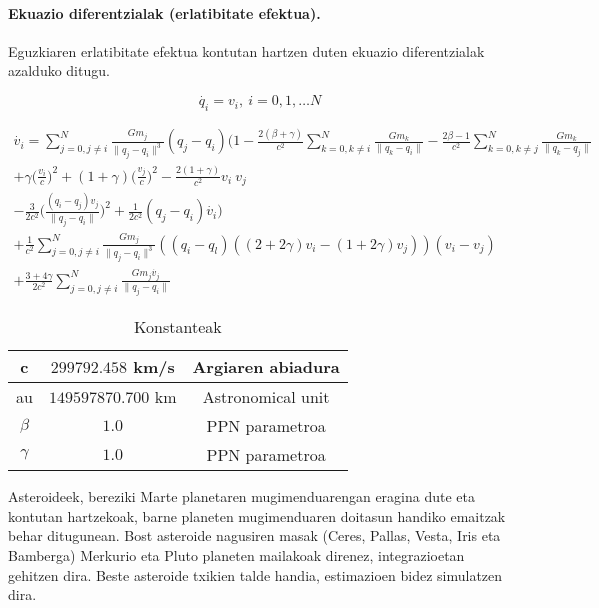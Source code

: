 \paragraph*{Ekuazio diferentzialak (erlatibitate efektua).}
Eguzkiaren erlatibitate efektua kontutan hartzen duten ekuazio diferentzialak azalduko ditugu.

\begin{equation}
\dot{q_i}=v_i, \  i=0,1,\dots N
\end{equation}

\begin{multline} 
\dot{v_i}= \sum_{j=0,j \neq i}^{N} \frac{Gm_j}{\|q_j-q_i\|^3} (q_j-q_i)
           \bigg(1- \frac{2(\beta+\gamma)}{c^2} \sum\limits_{k=0, k \neq i}^{N} \frac{Gm_k}{\|q_k-q_i\|} 
                  - \frac{2\beta-1}{c^2}        \sum\limits_{k=0, k \neq j}^{N} \frac{Gm_k}{\|q_k-q_j\|} \\
                  + \gamma \big(\frac{v_i}{c}\big)^2 + (1+\gamma) \big(\frac{v_j}{c} \big)^2 
                  - \frac{2(1+\gamma)}{c^2} v_i \ v_j \\
                  - \frac{3}{2c^2} \big(\frac{(q_i-q_j) v_j}{\|q_j-q_i\|} \big)^2+                  
                  \frac{1}{2c^2}(q_j-q_i) \dot{v_i} \bigg) \\
           + \frac{1}{c^2} \sum_{j=0,j \neq i}^{N} \frac{Gm_j}{\|q_j-q_i\|^3} 
             ((q_i-q_l) ((2+2\gamma)v_i-(1+2\gamma)v_j)) (v_i-v_j) \\
           + \frac{3+4\gamma}{2c^2} \sum_{j=0,j \neq i}^{N} \frac{Gm_j \dot{v_j}}{\|q_j-q_i\|}                                      
\end{multline}

\begin{table}[h]
\caption{Konstanteak}
\label{tab:1}       %
\centering
\begin{tabular}{ c c c }
\hline
  c             &  $299792.458$ km/s           & Argiaren abiadura  \\
\hline
  au            &  $149597870.700$ km           & Astronomical unit  \\
\hline 	       
$\beta$          & $1.0$                       & PPN parametroa     \\
\hline 
$\gamma$         & $1.0$                       & PPN parametroa     \\
\hline
\end{tabular}
\end{table}

Asteroideek, bereziki Marte planetaren mugimenduarengan eragina dute eta kontutan hartzekoak, barne planeten mugimenduaren doitasun handiko emaitzak behar ditugunean. Bost asteroide nagusiren masak (Ceres, Pallas, Vesta, Iris eta Bamberga) Merkurio eta Pluto planeten mailakoak direnez, integrazioetan gehitzen dira. Beste asteroide txikien talde handia, estimazioen bidez simulatzen dira.

